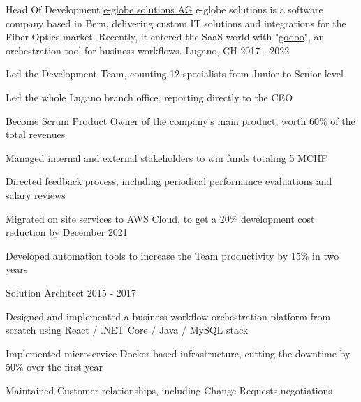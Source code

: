\begin{cventries}
	\cventry
	{Head Of Development} %
	{\href{https://www.e-globe-solutions.com}{e-globe solutions AG}} %
  {e-globe solutions is a software company based in Bern, delivering custom IT solutions and integrations for the Fiber Optics market. Recently, it entered the SaaS world with "\href{https://www.godoo.ch}{godoo}", an orchestration tool for business workflows.} %
	{Lugano, CH} %
	{2017 - 2022} %
	{
		\begin{cvitems} %
			\item {Led the Development Team, counting 12 specialists from Junior to Senior level}
			\item {Led the whole Lugano branch office, reporting directly to the CEO}
			\item {Become Scrum Product Owner of the company's main product, worth 60\% of the total revenues}
			\item {Managed internal and external stakeholders to win funds totaling 5 MCHF}
			\item {Directed feedback process, including periodical performance evaluations and salary reviews}
			\item {Migrated on site services to AWS Cloud, to get a 20\% development cost reduction by December 2021}
			\item {Developed automation tools to increase the Team productivity by 15\% in two years}
		\end{cvitems}
	}

  \cventry
    {Solution Architect} %
    {} %
    {} %
    {} %
    {2015 - 2017} %
    {
      \begin{cvitems} %
        \item {Designed and implemented a business workflow orchestration platform from scratch using React / .NET Core / Java / MySQL stack}
        \item {Implemented microservice Docker-based infrastructure, cutting the downtime by 50\% over the first year}
        \item {Maintained Customer relationships, including Change Requests negotiations}
      \end{cvitems}
    }


\end{cventries}
